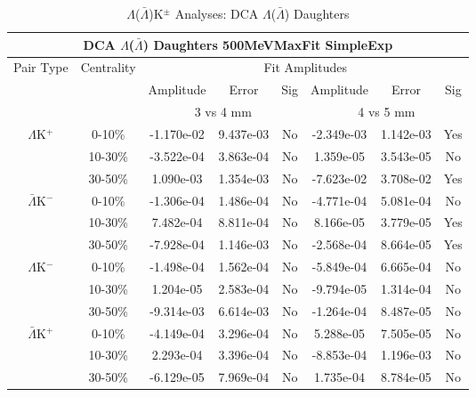 \documentclass[../AnalysisNoteJBuxton.tex]{subfiles}
\begin{document}
\begin{table}
 \centering
 \begin{tabular}{|c|c|c|c|c||c|c|c|}
  \multicolumn{8}{c}{DCA $\Lambda$($\bar{\Lambda}$) Daughters 500MeVMaxFit SimpleExp} \\
  \hline
  \multirow{3}{*}{Pair Type} & \multirow{3}{*}{Centrality} & \multicolumn{6}{c|}{Fit Amplitudes} \\
  \cline{3-8}
   & & Amplitude & Error & Sig & Amplitude & Error & Sig \\  
  \cline{3-8}
   & & \multicolumn{3}{c||}{3 vs 4 mm} & \multicolumn{3}{c|}{4 vs 5 mm} \\  
  \hline
  \multirow{3}{*}{$\Lambda$K$^{+}$}
   &  0-10\% & -1.170e-02 & 9.437e-03 & No & -2.349e-03 & 1.142e-03 & Yes \\
   & 10-30\% & -3.522e-04 & 3.863e-04 & No & 1.359e-05 & 3.543e-05 & No \\
   & 30-50\% & 1.090e-03 & 1.354e-03 & No & -7.623e-02 & 3.708e-02 & Yes \\
  \hline
  \multirow{3}{*}{$\bar{\Lambda}$K$^{-}$}
   &  0-10\% & -1.306e-04 & 1.486e-04 & No & -4.771e-04 & 5.081e-04 & No \\
   & 10-30\% & 7.482e-04 & 8.811e-04 & No & 8.166e-05 & 3.779e-05 & Yes \\
   & 30-50\% & -7.928e-04 & 1.146e-03 & No & -2.568e-04 & 8.664e-05 & Yes \\
  \hline \hline
  \multirow{3}{*}{$\Lambda$K$^{-}$}
   &  0-10\% & -1.498e-04 & 1.562e-04 & No & -5.849e-04 & 6.665e-04 & No \\
   & 10-30\% & 1.204e-05 & 2.583e-04 & No & -9.794e-05 & 1.314e-04 & No \\
   & 30-50\% & -9.314e-03 & 6.614e-03 & No & -1.264e-04 & 8.487e-05 & No \\
  \hline
  \multirow{3}{*}{$\bar{\Lambda}$K$^{+}$}
   &  0-10\% & -4.149e-04 & 3.296e-04 & No & 5.288e-05 & 7.505e-05 & No \\
   & 10-30\% & 2.293e-04 & 3.396e-04 & No & -8.853e-04 & 1.196e-03 & No \\
   & 30-50\% & -6.129e-05 & 7.969e-04 & No & 1.735e-04 & 8.784e-05 & No \\
  \hline
 \end{tabular}
 \caption{$\Lambda$($\bar{\Lambda}$)K$^{\pm}$ Analyses: DCA $\Lambda$($\bar{\Lambda}$) Daughters}
 \label{tab:LamDaughtersDcaLamKch_500MeVMaxFit_SimpleExp}
\end{table}
\end{document}
